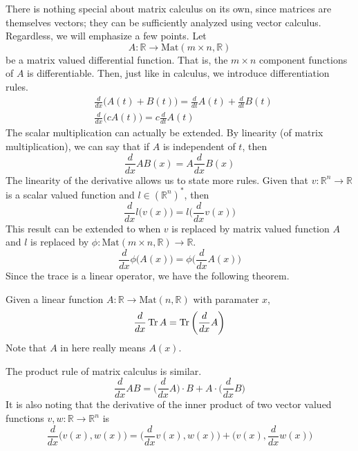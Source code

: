   There is nothing special about matrix calculus on its own, since matrices are themselves vectors; they can be sufficiently analyzed using vector calculus. Regardless, we will emphasize a few points. Let
  \begin{equation}
    A: \mathbb{R} \longrightarrow \text{Mat}(m \times n, \mathbb{R})
  \end{equation}
  be a matrix valued differential function. That is, the $m \times n$ component functions of $A$ is differentiable. Then, just like in calculus, we introduce differentiation rules.
  \begin{align*}
    & \frac{d}{d x} \big( A(t) + B(t)\big) = \frac{d}{d t} A(t) + \frac{d}{d t} B(t) \\
    & \frac{d}{d x} \big( c A(t)\big) = c \frac{d}{d t} A(t)
  \end{align*}
  The scalar multiplication can actually be extended. By linearity (of matrix multiplication), we can say that if $A$ is independent of $t$, then 
  \begin{equation}
    \frac{d}{d x} A B (x) = A \frac{d}{d x} B(x)
  \end{equation}
  The linearity of the derivative allows us to state more rules. Given that $v: \mathbb{R}^n \longrightarrow \mathbb{R}$ is a scalar valued function and $l \in (\mathbb{R}^n)^*$, then  
  \begin{equation}
    \frac{d}{d x} l \big( v(x) \big) = l \bigg( \frac{d}{d x} v(x) \bigg)
  \end{equation}
  This result can be extended to when $v$ is replaced by matrix valued function $A$ and $l$ is replaced by $\phi: \text{Mat}(m \times n, \mathbb{R}) \longrightarrow \mathbb{R}$. 
  \begin{equation}
    \frac{d}{d x} \phi \big( A(x) \big) = \phi \bigg( \frac{d}{d x} A(x) \bigg)
  \end{equation}
  Since the trace is a linear operator, we have the following theorem. 

  \begin{theorem}
    Given a linear function $A: \mathbb{R} \longrightarrow \text{Mat}(n, \mathbb{R})$ with paramater $x$, 
    \begin{equation}
      \frac{d}{d x} \Tr{A} = \Tr \bigg( \frac{d}{d x} A \bigg)
    \end{equation}
    Note that $A$ in here really means $A(x)$.
  \end{theorem}

  The product rule of matrix calculus is similar.
  \begin{equation}
    \frac{d}{d x} A B = \bigg(\frac{d}{d x} A\bigg) \cdot B + A \cdot \bigg(\frac{d}{d x} B \bigg)
  \end{equation}
  It is also noting that the derivative of the inner product of two vector valued functions $v, w: \mathbb{R} \longrightarrow \mathbb{R}^n$ is 
  \begin{equation}
    \frac{d}{d x} \big( v(x), w(x) \big) = \Big( \frac{d}{d x} v(x), w(x) \Big) + \Big( v(x), \frac{d}{d x} w(x) \Big)
  \end{equation}

